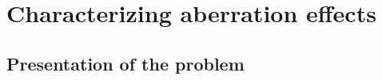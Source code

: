 \documentclass[12pt]{iopart}
\begin{document}









\section{Characterizing aberration effects}

\subsection{Presentation of the problem}
\end{document}
